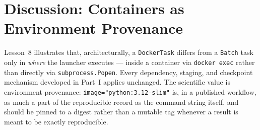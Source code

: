 \section{Discussion: Containers as Environment Provenance}

Lesson~8 illustrates that, architecturally, a \texttt{DockerTask} differs
from a \texttt{Batch} task only in \emph{where} the launcher executes ---
inside a container via \texttt{docker exec} rather than directly via
\texttt{subprocess.Popen}. Every dependency, staging, and checkpoint
mechanism developed in Part~I applies unchanged. The scientific value is
environment provenance: \texttt{image="python:3.12-slim"} is, in a published
workflow, as much a part of the reproducible record as the command string
itself, and should be pinned to a digest rather than a mutable tag whenever a
result is meant to be exactly reproducible.

